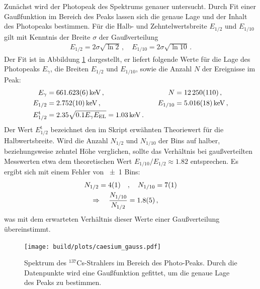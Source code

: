 Zunächst wird der Photopeak des Spektrums genauer untersucht. Durch Fit einer
Gaußfunktion im Bereich des Peaks lassen sich die genaue Lage und der Inhalt
des Photopeaks bestimmen.
Für die Halb- und Zehntelwertsbreite $E_{1/2}$ und $E_{1/10}$ gilt mit Kenntnis
der Breite $\sigma$ der Gaußverteilung
\begin{align*}
    E_{1/2} = 2\sigma\sqrt{\ln 2}\,,\quad E_{1/10} = 2\sigma\sqrt{\ln 10}\,.
\end{align*}
Der Fit ist in Abbildung \ref{fig:cs_gauss} dargestellt, er liefert folgende
Werte für die Lage des Photopeaks $E_\gamma$, die Breiten $E_{1/2}$ und
$E_{1/10}$, sowie die Anzahl $N$ der Ereignisse im Peak:
\begin{align*}
    E_\gamma &= \SI{661.623+-0.006}{keV} \,,&\quad N &= \num{12250+-110}\,,\\
    E_{1/2} &= \SI{2.752+-0.010}{keV}\,,&\quad E_{1/10} &= \SI{5.016+-0.018}{keV}\,,\\
    E_{1/2}^\text{t} &= \num{2.35} \sqrt{\num{0.1} E_\gamma E_\text{EL}} = \SI{1.03+-0.00}{keV}\,.
\end{align*}
Der Wert $E_{1/2}^\text{t}$ bezeichnet den im Skript erwähnten Theoriewert
für die Halbwertsbreite.
Wird die Anzahl $N_{1/2}$ und $N_{1/10}$ der Bins auf halber, beziehungsweise
zehntel Höhe verglichen, sollte das Verhältnis bei gaußverteilten Messwerten
etwa dem theoretischen Wert $E_{1/10}/E_{1/2}\approx \num{1.82}$ entsprechen.
Es ergibt sich mit einem Fehler von \num{+-1} Bins:
\begin{align*}
    N_{1/2} = \num{4+-1} \quad&,\quad N_{1/10} = \num{7+-1} \\
    \Rightarrow\quad\frac{N_{1/10}}{N_{1/2}} &= \num{1.8+-0.5}\,,
\end{align*}
was mit dem erwarteten Verhältnis dieser Werte einer Gaußverteilung
übereinstimmt.
\begin{figure}
    \centering
    \texttt{[image: build/plots/caesium\_gauss.pdf]}
    \caption{
        Spektrum des $^{137}$Cs-Strahlers im Bereich des Photo-Peaks. Durch
        die Datenpunkte wird eine Gaußfunktion gefittet, um die genaue Lage
        des Peaks zu bestimmen.
    }
    \label{fig:cs_gauss}
\end{figure}

